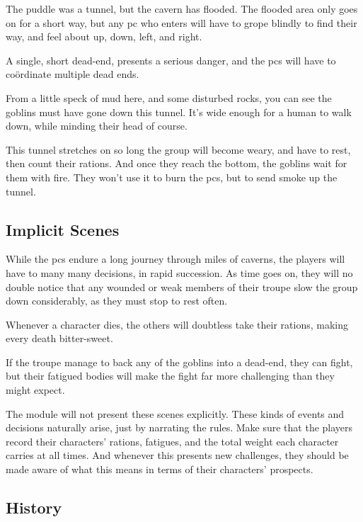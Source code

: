 \begin{multicols}{2}
\noindent
The puddle was a tunnel, but the cavern has flooded.
The flooded area only goes on for a short way, but any \gls{pc} who enters will have to grope blindly to find their way, and feel about up, down, left, and right.

A single, short dead-end, presents a serious danger, and the \glspl{pc} will have to co\"{o}rdinate multiple dead ends.

\begin{boxtext}
  From a little speck of mud here, and some disturbed rocks, you can see the goblins must have gone down this tunnel.
  It's wide enough for a human to walk down, while minding their head of course.
\end{boxtext}

\noindent
This tunnel stretches on so long the group will become weary, and have to rest, then count their rations.
And once they reach the bottom, the goblins wait for them with fire.
They won't use it to burn the \glspl{pc}, but to send smoke up the tunnel.

\subsection{Implicit Scenes}

While the \glspl{pc} endure a long journey through miles of caverns, the players will have to many many decisions, in rapid succession.
As time goes on, they will no double notice that any wounded or weak members of their troupe slow the group down considerably, as they must stop to rest often.

Whenever a character dies, the others will doubtless take their rations, making every death bitter-sweet.

If the troupe manage to back any of the goblins into a dead-end, they can fight, but their fatigued bodies will make the fight far more challenging than they might expect.

The module will not present these scenes explicitly.
These kinds of events and decisions naturally arise, just by narrating the rules.
Make sure that the players record their characters' rations, \glspl{fatigue}, and the total \gls{weight} each character carries at all times.
And whenever this presents new challenges, they should be made aware of what this means in terms of their characters' prospects.

\subsection{History}
\label{caves_history}


\end{multicols}
